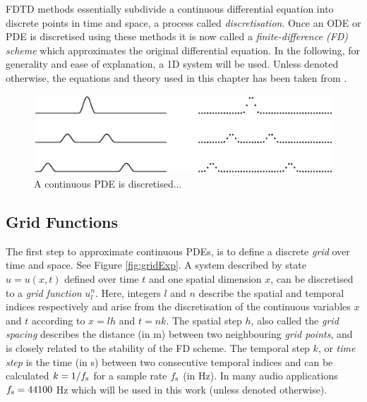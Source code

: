 
FDTD methods essentially subdivide a continuous differential equation into discrete points in time and space, a process called \textit{discretisation}. Once an ODE or PDE is discretised using these methods it is now called a \textit{finite-difference (FD) scheme} which approximates the original differential equation. In the following, for generality and ease of explanation, a 1D system will be used. Unless denoted otherwise, the equations and theory used in this chapter has been taken from \cite{theBible}.

\begin{figure}[h]
    \centering
    \includegraphics[width=\textwidth]{figures/fdtd/gridFigure.eps}
    \caption{\label{fig:discretisation} A continuous PDE is discretised... }
\end{figure}

\subsection{Grid Functions } \label{sec:gridFunctions}
The first step to approximate continuous PDEs, is to define a discrete \textit{grid} over time and space. See Figure \ref{fig:gridExp}. A system described by state $u = u(x,t)$ defined over time $t$ and one spatial dimension $x$, can be discretised to a \textit{grid function} $u_l^n$. Here, integers $l$ and $n$ describe the spatial and temporal indices respectively and arise from the discretisation of the continuous variables $x$ and $t$ according to $x=lh$ and $t=nk$. The spatial step $h$, also called the \textit{grid spacing} describes the distance (in m) between two neighbouring \textit{grid points}, and is closely related to the stability of the FD scheme. The temporal step $k$, or \textit{time step} is the time (in s) between two consecutive temporal indices and can be calculated $k=1/f_\text{s}$ for a sample rate $f_\text{s}$ (in Hz). In many audio applications $f_\text{s} = 44100$ Hz which will be used in this work (unless denoted otherwise).

